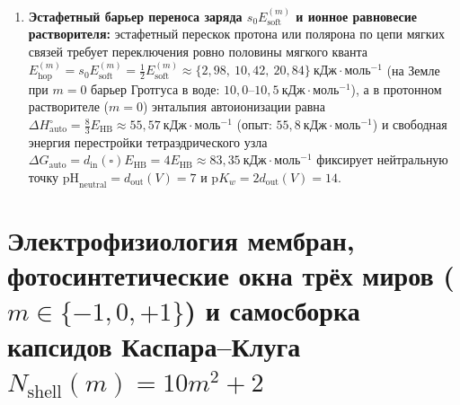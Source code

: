 \begin{theorem}
\begin{enumerate}[leftmargin=*]
\item \textbf{Эстафетный барьер переноса заряда $s_0 E_{\mathrm{soft}}^{(m)}$ и ионное равновесие растворителя:}
  эстафетный перескок протона или полярона по цепи мягких связей требует переключения ровно половины мягкого кванта $E_{\mathrm{hop}}^{(m)} = s_0 E_{\mathrm{soft}}^{(m)} = \frac{1}{2}E_{\mathrm{soft}}^{(m)} \approx \{2{,}98,\ 10{,}42,\ 20{,}84\}\ \text{кДж}\cdot\text{моль}^{-1}$ (на Земле при $m=0$ барьер Гротгуса в воде: $10{,}0\text{--}10{,}5\ \text{кДж}\cdot\text{моль}^{-1}$), а в протонном растворителе ($m=0$) энтальпия автоионизации равна $\Delta H_{\mathrm{auto}}^\circ = \frac{8}{3}E_{\mathrm{HB}} \approx 55{,}57\ \text{кДж}\cdot\text{моль}^{-1}$ (опыт: $55{,}8\ \text{кДж}\cdot\text{моль}^{-1}$) и свободная энергия перестройки тетраэдрического узла $\Delta G_{\mathrm{auto}} = d_{\mathrm{in}}(\square)E_{\mathrm{HB}} = 4E_{\mathrm{HB}} \approx 83{,}35\ \text{кДж}\cdot\text{моль}^{-1}$ фиксирует нейтральную точку $\mathrm{pH}_{\mathrm{neutral}} = d_{\mathrm{out}}(V) = 7$ и $\mathrm{p}K_w = 2d_{\mathrm{out}}(V) = 14$.
\end{enumerate}
\end{theorem}

\section{Электрофизиология мембран, фотосинтетические окна трёх миров (\texorpdfstring{$m\in\{-1,0,+1\}$}{m in {-1,0,+1}}) и самосборка капсидов Каспара--Клуга \texorpdfstring{$N_{\mathrm{shell}}(m) = 10m^2+2$}{N\_shell(m) = 10m\^2+2}}
\label{sec:bio-neuro-photosynthesis-harmony}

